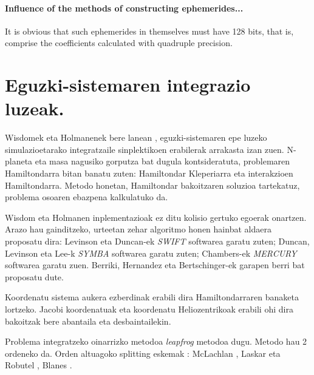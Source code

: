 \paragraph{Influence of the methods of constructing ephemerides...}
It is obvious that such ephemerides in themselves must have 128 bits, that is, comprise the coefficients calculated with quadruple precision.


\section{Eguzki-sistemaren integrazio luzeak.}

Wisdomek eta Holmanenek bere lanean ,  eguzki-sistemaren epe luzeko simulazioetarako integratzaile  sinplektikoen erabilerak arrakasta izan zuen. N-planeta eta masa nagusiko gorputza bat dugula kontsideratuta, problemaren Hamiltondarra bitan banatu zuten:  Hamiltondar Kleperiarra eta interakzioen Hamiltondarra. Metodo honetan, Hamiltondar bakoitzaren soluzioa tartekatuz, problema osoaren ebazpena kalkulatuko da. 

Wisdom eta Holmanen inplementazioak ez ditu kolisio gertuko egoerak onartzen. Arazo hau gainditzeko, urteetan zehar algoritmo honen hainbat aldaera proposatu dira: Levinson eta Duncan-ek   \emph{SWIFT} softwarea garatu zuten;  Duncan, Levinson eta Lee-k  \emph{SYMBA} softwarea garatu zuten; Chambers-ek \cite{Chambers1999} \emph{MERCURY} softwarea garatu zuen. Berriki, Hernandez eta Bertschinger-ek  garapen berri bat proposatu dute.

Koordenatu sistema aukera ezberdinak erabili dira Hamiltondarraren banaketa lortzeko. Jacobi koordenatuak eta koordenatu Heliozentrikoak erabili ohi dira bakoitzak bere abantaila eta desbaintailekin.

Problema integratzeko oinarrizko metodoa \emph{leapfrog} metodoa dugu. Metodo hau 2 ordeneko da. Orden altuagoko splitting eskemak : McLachlan , Laskar eta Robutel \cite[2001]{Laskar2001}, Blanes \cite{Blanes2013}.

   
       
